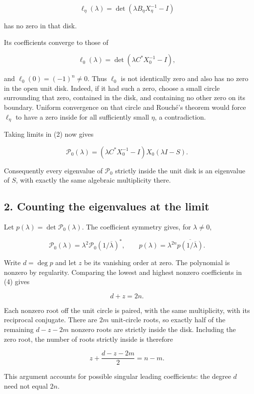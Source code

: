 \documentclass[10pt,a4paper]{article}
\begin{document}
\[
\ell_\eta(\lambda)=\det(\lambda B_\eta X_\eta^{-1}-I)
\]

has no zero in that disk.

Its coefficients converge to those of

\[
\ell_0(\lambda)=\det(\lambda C^*X_0^{-1}-I),
\]

and \(\ell_0(0)=(-1)^n\ne0\). Thus \(\ell_0\) is not identically zero
and also has no zero in the open unit disk. Indeed, if it had such a
zero, choose a small circle surrounding that zero, contained in the
disk, and containing no other zero on its boundary. Uniform convergence
on that circle and Rouché's theorem would force \(\ell_\eta\) to have a
zero inside for all sufficiently small \(\eta\), a contradiction.

Taking limits in (2) now gives

\[
\mathcal P_0(\lambda)
=(\lambda C^*X_0^{-1}-I)X_0(\lambda I-S). \tag{3}
\]

Consequently every eigenvalue of \(\mathcal P_0\) strictly inside the
unit disk is an eigenvalue of \(S\), with exactly the same algebraic
multiplicity there.

\subsection{2. Counting the eigenvalues at the
limit}\label{counting-the-eigenvalues-at-the-limit}

Let \(p(\lambda)=\det\mathcal P_0(\lambda)\). The coefficient symmetry
gives, for \(\lambda\ne0\),

\[
\mathcal P_0(\lambda)
=\lambda^2\mathcal P_0(1/\overline\lambda)^*,
\qquad
p(\lambda)=\lambda^{2n}\overline{p(1/\overline\lambda)}. \tag{4}
\]

Write \(d=\deg p\) and let \(z\) be its vanishing order at zero. The
polynomial is nonzero by regularity. Comparing the lowest and highest
nonzero coefficients in (4) gives

\[
d+z=2n. \tag{5}
\]

Each nonzero root off the unit circle is paired, with the same
multiplicity, with its reciprocal conjugate. There are \(2m\)
unit-circle roots, so exactly half of the remaining \(d-z-2m\) nonzero
roots are strictly inside the disk. Including the zero root, the number
of roots strictly inside is therefore

\[
z+\frac{d-z-2m}{2}=n-m. \tag{6}
\]

This argument accounts for possible singular leading coefficients: the
degree \(d\) need not equal \(2n\).
\end{document}
